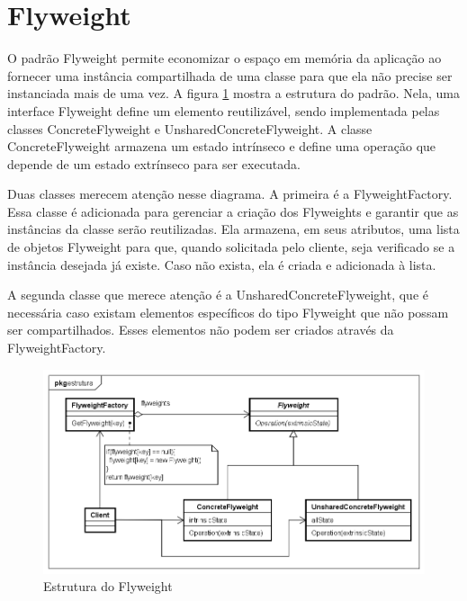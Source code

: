 \section{Flyweight}

O padrão Flyweight permite economizar o espaço em memória 
da aplicação ao fornecer uma instância compartilhada de 
uma classe para que ela não precise ser instanciada 
mais de uma vez. A figura \ref{flyweight_struct} mostra 
a estrutura do padrão. Nela, uma interface Flyweight 
define um elemento reutilizável, sendo implementada 
pelas classes ConcreteFlyweight e UnsharedConcreteFlyweight. 
A classe ConcreteFlyweight armazena um estado intrínseco 
e define uma operação que depende de um estado extrínseco 
para ser executada. 

Duas classes merecem atenção nesse diagrama. A primeira 
é a FlyweightFactory. Essa classe é adicionada para 
gerenciar a criação dos Flyweights e garantir que as 
instâncias da classe serão reutilizadas. Ela armazena, em 
seus atributos, uma lista de objetos Flyweight para que,  
quando solicitada pelo cliente, seja verificado se a instância 
desejada já existe. Caso não exista, ela é criada e 
adicionada à lista. 

A segunda classe que merece atenção é a UnsharedConcreteFlyweight, 
que é necessária caso existam elementos específicos 
do tipo Flyweight que não possam ser compartilhados. 
Esses elementos não podem ser criados através da 
FlyweightFactory.

\begin{figure}[htb]
	\caption{\label{flyweight_struct}Estrutura do Flyweight}
	\begin{center}
	    \includegraphics[scale=0.5]{5_padroes-contexto-funcional/5.2_estruturais/5.2.6_flyweight/flyweight_estrutura.png}
	\end{center}
\end{figure}

